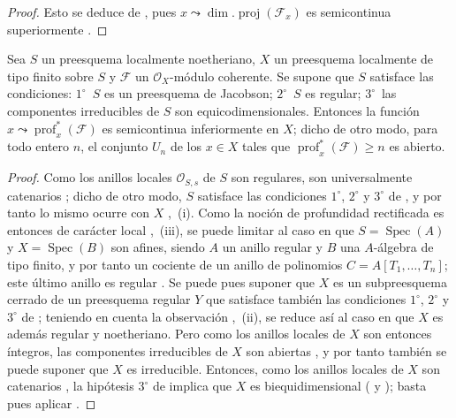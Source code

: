 \begin{proof}
Esto se deduce de , pues $x\leadsto\dim.\operatorname{proj}(\mathcal F_x)$ es semicontinua superiormente .
\end{proof}

\begin{proposition}[10.8.5]
\label{IV.10.8.5}
Sea $S$ un preesquema localmente noetheriano, $X$ un preesquema localmente de tipo finito sobre $S$ y $\mathcal F$ un $\mathcal O_X$-módulo coherente.
Se supone que $S$ satisface las condiciones: $1^\circ$~$S$ es un preesquema de Jacobson; $2^\circ$~$S$ es regular; $3^\circ$~las componentes irreducibles de $S$ son equicodimensionales.
Entonces la función $x\leadsto\operatorname{prof}^{*}_{x}(\mathcal F)$ es semicontinua inferiormente en $X$; dicho de otro modo, para todo entero $n$, el conjunto $U_n$ de los $x\in X$ tales que $\operatorname{prof}^{*}_{x}(\mathcal F)\geq n$ es abierto.
\end{proposition}

\begin{proof}
Como los anillos locales $\mathcal O_{S,s}$ de $S$ son regulares, son universalmente catenarios ; dicho de otro modo, $S$ satisface las condiciones $1^\circ$, $2^\circ$ y $3^\circ$ de , y por tanto lo mismo ocurre con $X$ ,~(i).
Como la noción de profundidad rectificada es entonces de carácter local ,~(iii), se puede limitar al caso en que $S=\operatorname{Spec}(A)$ y $X=\operatorname{Spec}(B)$ son afines, siendo $A$ un anillo regular y $B$ una $A$-álgebra de tipo finito, y por tanto un cociente de un anillo de polinomios $C=A[T_1,\ldots,T_n]$; este último anillo es regular .
Se puede pues suponer que $X$ es un subpreesquema cerrado de un preesquema regular $Y$ que satisface también las condiciones $1^\circ$, $2^\circ$ y $3^\circ$ de ; teniendo en cuenta la observación ,~(ii), se reduce así al caso en que $X$ es además regular y noetheriano.
Pero como los anillos locales de $X$ son entonces íntegros, las componentes irreducibles de $X$ son
abiertas , y por tanto también se puede suponer que $X$ es irreducible.
Entonces, como los anillos locales de $X$ son catenarios , la hipótesis $3^\circ$ de  implica que $X$ es biequidimensional ( y ); basta pues aplicar .
\end{proof}


